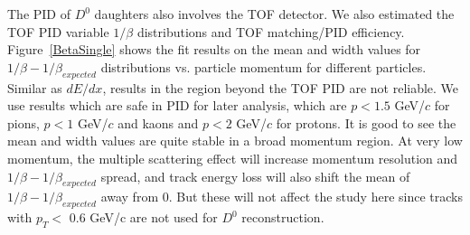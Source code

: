 \begin{figure}
\end{figure}

The PID of $D^0$ daughters also involves the TOF detector. We also estimated the TOF PID variable $1/\beta$ distributions and TOF matching/PID efficiency. Figure~\ref{BetaSingle} shows the fit results on the mean and width values for $1/\beta-1/\beta_{expected}$ distributions vs. particle momentum for different particles. Similar as $dE/dx$, results in the region beyond the TOF PID are not reliable. We use results which are safe in PID for later analysis, which are $p<1.5$ GeV/$c$ for pions, $p<1$ GeV/$c$ and kaons and $p<2$ GeV/$c$ for protons. It is good to see the mean and width values are quite stable in a broad momentum region. At very low momentum, the multiple scattering effect will increase momentum resolution and $1/\beta-1/\beta_{expected}$ spread, and track energy loss will also shift the mean of $1/\beta-1/\beta_{expected}$ away from 0. But these will not affect the study here since tracks with $p_T < $ 0.6 GeV/c are not used for $D^0$ reconstruction. 

\begin{figure}
\end{figure}

